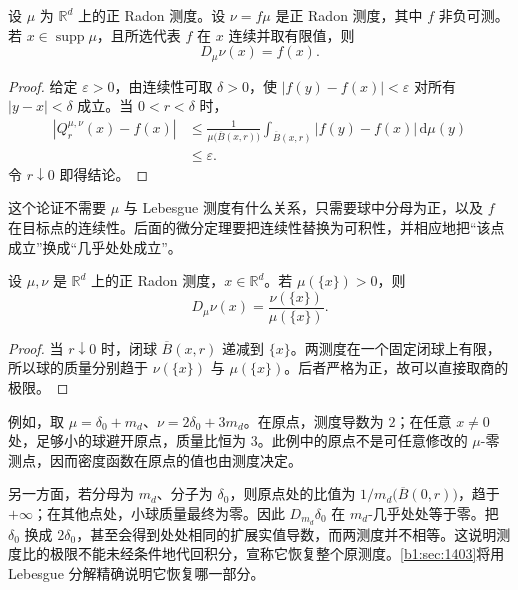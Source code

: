 \begin{proposition}
\label{b1:prop:continuous-density-recovery}
设 \(\mu\) 为 \(\mathbb R^d\) 上的正 Radon 测度。设 \(\nu=f\mu\) 是正 Radon 测度，其中 \(f\) 非负可测。若 \(x\in\operatorname{supp}\mu\)，且所选代表 \(f\) 在 \(x\) 连续并取有限值，则
\[
D_\mu\nu(x)=f(x).
\]
\end{proposition}
\begin{proof}
给定 \(\varepsilon>0\)，由连续性可取 \(\delta>0\)，使 \(|f(y)-f(x)|<\varepsilon\) 对所有 \(|y-x|<\delta\) 成立。当 \(0<r<\delta\) 时，
\[
\begin{aligned}
\left|Q_r^{\mu,\nu}(x)-f(x)\right|
&\leq\frac{1}{\mu\bigl(\overline B(x,r)\bigr)}
\int_{\overline B(x,r)}|f(y)-f(x)|\,\mathrm d\mu(y)\\
&\leq\varepsilon.
\end{aligned}
\]
令 \(r\downarrow0\) 即得结论。
\end{proof}

这个论证不需要 \(\mu\) 与 Lebesgue 测度有什么关系，只需要球中分母为正，以及 \(f\) 在目标点的连续性。后面的微分定理要把连续性替换为可积性，并相应地把“该点成立”换成“几乎处处成立”。

\begin{proposition}
\label{b1:prop:atomic-density-ratio}
设 \(\mu,\nu\) 是 \(\mathbb R^d\) 上的正 Radon 测度，\(x\in\mathbb R^d\)。若 \(\mu(\{x\})>0\)，则
\[
D_\mu\nu(x)=\frac{\nu(\{x\})}{\mu(\{x\})}.
\]
\end{proposition}
\begin{proof}
当 \(r\downarrow0\) 时，闭球 \(\overline B(x,r)\) 递减到 \(\{x\}\)。两测度在一个固定闭球上有限，所以球的质量分别趋于 \(\nu(\{x\})\) 与 \(\mu(\{x\})\)。后者严格为正，故可以直接取商的极限。
\end{proof}

例如，取 \(\mu=\delta_0+m_d\)、\(\nu=2\delta_0+3m_d\)。在原点，测度导数为 \(2\)；在任意 \(x\ne0\) 处，足够小的球避开原点，质量比恒为 \(3\)。此例中的原点不是可任意修改的 \(\mu\)-零测点，因而密度函数在原点的值也由测度决定。

\ProseParagraphBreak

另一方面，若分母为 \(m_d\)、分子为 \(\delta_0\)，则原点处的比值为 \(1/m_d\bigl(\overline B(0,r)\bigr)\)，趋于 \(+\infty\)；在其他点处，小球质量最终为零。因此 \(D_{m_d}\delta_0\) 在 \(m_d\)-几乎处处等于零。把 \(\delta_0\) 换成 \(2\delta_0\)，甚至会得到处处相同的扩展实值导数，而两测度并不相等。这说明测度比的极限不能未经条件地代回积分，宣称它恢复整个原测度。\cref{b1:sec:1403}将用 Lebesgue 分解精确说明它恢复哪一部分。
